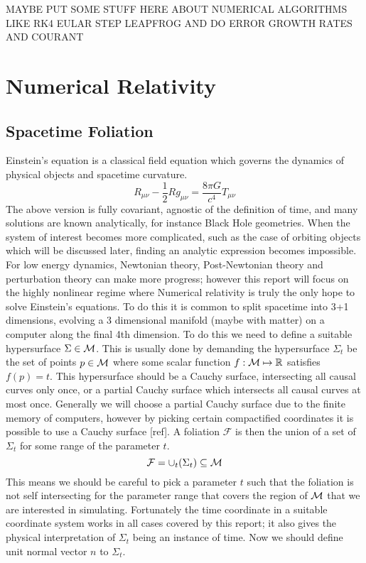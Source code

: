 




MAYBE PUT SOME STUFF HERE ABOUT NUMERICAL ALGORITHMS LIKE RK4 EULAR STEP LEAPFROG AND DO ERROR GROWTH RATES AND COURANT


\section{Numerical Relativity}
\subsection{Spacetime Foliation}
Einstein's equation is a classical field equation which governs the dynamics of physical objects and spacetime curvature. 
\begin{equation}R_{\mu\nu} - \frac{1}{2} Rg_{\mu\nu} = \frac{8\pi G}{c^4}T_{\mu\nu}\end{equation}
The above version is fully covariant, agnostic of the definition of time, and many solutions are known analytically, for instance Black Hole geometries. When the system of interest becomes more complicated, such as the case of orbiting objects which will be discussed later, finding an analytic expression becomes impossible. For low energy dynamics, Newtonian theory, Post-Newtonian theory and perturbation theory can make more progress; however this report will focus on the highly nonlinear regime where Numerical relativity is truly the only hope to solve Einstein's equations. To do this it is common to split spacetime into 3+1 dimensions, evolving a 3 dimensional manifold (maybe with matter) on a computer along the final 4th dimension. To do this we need to define a suitable hypersurface $\Sigma \in \mathcal{M}$. This is usually done by demanding the hypersurface $\Sigma_t$ be the set of points $p \in \mathcal{M}$ where some scalar function $f:\mathcal{M}\mapsto \mathbb{R}$ satisfies $f(p)=t$. This hypersurface should be a Cauchy surface, intersecting all causal curves only once, or a partial Cauchy surface which intersects all causal curves at most once. Generally we will choose a partial Cauchy surface due to the finite memory of computers, however by picking certain compactified coordinates it is possible to use a Cauchy surface [ref]. A foliation $\mathcal{F}$ is then the union of a set of $\Sigma_t$ for some range of the parameter $t$.
\begin{equation}\mathcal{F} = \cup_t(\Sigma_t) \subseteq \mathcal{M}\end{equation}
This means we should be careful to pick a parameter $t$ such that the foliation is not self intersecting for the parameter range that covers the region of $\mathcal{M}$ that we are interested in simulating. Fortunately the time coordinate in a suitable coordinate system works in all cases covered by this report; it also gives the physical interpretation of $\Sigma_t$ being an instance of time. Now we should define unit normal vector $n$ to $\Sigma_t$.
